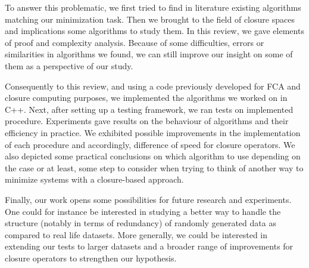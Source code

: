 \documentclass[a4paper]{report}
\begin{document}
\vspace{1.2em}

To answer this problematic, we first tried to find in literature existing algorithms matching our minimization task. Then we brought to the field of closure spaces and implications some algorithms to study them. In this review, we gave elements of proof and complexity analysis. Because of some difficulties, errors or similarities in algorithms we found, we can still improve our insight on some of them as a perspective of our study.

\vspace{1.2em}

Consequently to this review, and using a code previously developed for FCA and closure computing purposes, we implemented the algorithms we worked on in C++. Next, after setting up a testing framework, we ran tests on implemented procedure. Experiments gave results on the behaviour of algorithms
and their efficiency in practice. We exhibited  possible improvements in the implementation of each procedure and accordingly, difference of speed
for closure operators. We also depicted some practical conclusions on which algorithm to use depending on the case or at least, some step to consider when trying to think of another way to minimize systems with a closure-based approach.

\vspace{1.2em}

Finally, our work opens some possibilities for future research and experiments. One could for instance be interested in studying a better way to handle the structure (notably in terms of redundancy) of randomly generated data as compared to real life datasets. More generally, we could be interested in extending our tests to larger datasets and a broader range of improvements for closure operators to strengthen our hypothesis.




\newpage
{}
\setcounter{page}{8}


	

\newpage
\end{document}
